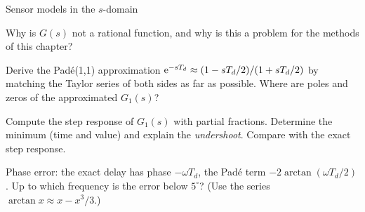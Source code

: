 \begin{exercise}{Sensor models in the $s$-domain}{\Paper}
\begin{tasks}
    \begin{tasks}
      \item Why is $G(s)$ not a rational function, and why is this a problem
        for the methods of this chapter?
      \item Derive the Pad\'e(1,1) approximation
        $\mathrm{e}^{-sT_d}\approx(1-sT_d/2)/(1+sT_d/2)$ by matching the Taylor series
        of both sides as far as possible. Where are poles and zeros of the
        approximated $G_1(s)$?
      \item Compute the step response of $G_1(s)$ with partial fractions.
        Determine the minimum (time and value) and explain the
        \emph{undershoot}. Compare with the exact step response.
      \item Phase error: the exact delay has phase $-\omega T_d$, the Pad\'e
        term $-2\arctan(\omega T_d/2)$. Up to which frequency is the error
        below $5^\circ$? (Use the series $\arctan x\approx x-x^3/3$.)
    \end{tasks}
\end{tasks}
\end{exercise}

